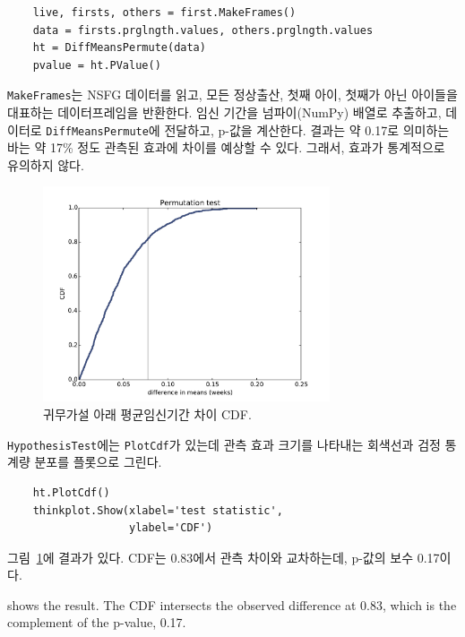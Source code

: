 \begin{verbatim}
    live, firsts, others = first.MakeFrames()
    data = firsts.prglngth.values, others.prglngth.values
    ht = DiffMeansPermute(data)
    pvalue = ht.PValue()
\end{verbatim}

{\tt MakeFrames}는 NSFG 데이터를 읽고, 모든 정상출산, 첫째 아이, 첫째가 아닌 아이들을 대표하는 데이터프레임을 반환한다.
임신 기간을 넘파이(NumPy) 배열로 추출하고, 데이터로 {\tt DiffMeansPermute}에 전달하고, p-값을 계산한다.
결과는 약 0.17로 의미하는 바는 약 17\% 정도 관측된 효과에 차이를 예상할 수 있다. 그래서, 효과가 통계적으로 유의하지 않다.


\begin{figure}
\centerline{\includegraphics[height=2.5in]{figs/hypothesis1.pdf}}
\caption{귀무가설 아래 평균임신기간 차이 CDF.}
\label{hypothesis1}
\end{figure}

{\tt HypothesisTest}에는 {\tt PlotCdf}가 있는데 관측 효과 크기를 나타내는 회색선과 검정 통계량 분포를 플롯으로 그린다.

\begin{verbatim}
    ht.PlotCdf()
    thinkplot.Show(xlabel='test statistic',
                   ylabel='CDF')
\end{verbatim}

그림~\ref{hypothesis1}에 결과가 있다.
CDF는 0.83에서 관측 차이와 교차하는데, p-값의 보수 0.17이다.

 shows the result.  The CDF intersects the
observed difference at 0.83, which is the complement of the p-value,
0.17.

